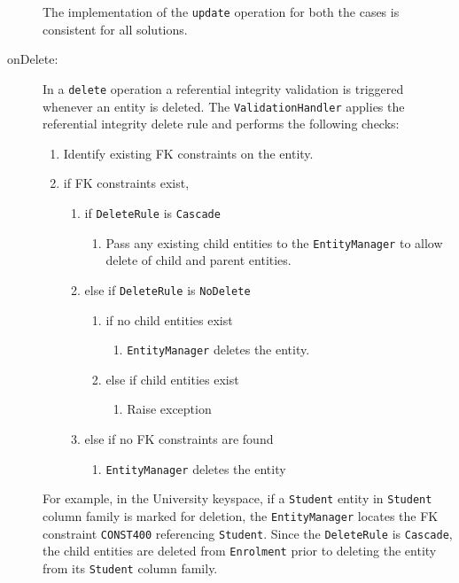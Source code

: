 \begin{description}
\begin{description}
	
		
		\end{description}
		The implementation of the \texttt{update} operation for both the cases is
		consistent for all solutions.
		
		\item[onDelete:] In a \texttt{delete} operation a referential
		integrity validation is triggered whenever an entity is deleted. The
		\texttt{ValidationHandler} applies the referential integrity delete rule
		and performs the following checks:
		\renewcommand{\labelenumii}{\arabic{enumi}.\arabic{enumii}}
		\renewcommand{\labelenumiii}{\arabic{enumi}.\arabic{enumii}.\arabic{enumiii}}
		
		\begin{enumerate}
		  \item Identify existing \ac{FK} constraints on the entity.
		  \item if \ac{FK} constraints exist,
		  		\begin{enumerate}
		  		  \item if \texttt{DeleteRule} is \texttt{Cascade}
		  		 		\begin{enumerate}
		  		 		   \item Pass any existing child entities to the \texttt{EntityManager}
		  		 		   to allow delete of child  and parent entities.
		  		 		\end{enumerate}
		  		  \item else if \texttt{DeleteRule}  is \texttt{NoDelete}
						\begin{enumerate}
						  \item if no child entities exist
						  		\begin{enumerate}
						  		  \item \texttt{EntityManager} deletes the entity.
						  		\end{enumerate}
						  \item else if child entities exist
						   		\begin{enumerate}
						    		\item Raise exception  
						    	\end{enumerate}
						\end{enumerate}
						
				  \item else if no \ac{FK} constraints are found 
				  		\begin{enumerate}
				  		  \item \texttt{EntityManager} deletes the entity
						\end{enumerate}
		  		\end{enumerate}
		\end{enumerate}	
		For example,  in the University keyspace,  if a 
		\texttt{Student} entity in \texttt{Student} column family is marked for
		deletion, the \texttt{EntityManager} locates the \ac{FK} constraint 
		\texttt{CONST400} referencing \texttt{Student}.
		Since the \texttt{DeleteRule} is \texttt{Cascade}, 
		the child entities are deleted from \texttt{Enrolment} prior to deleting the
		entity from its \texttt{Student} column family. 
		\end{description}
		
